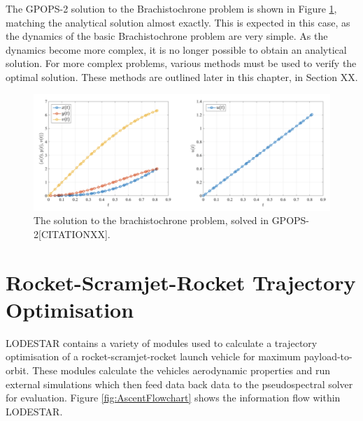 The GPOPS-2 solution to the Brachistochrone problem is shown in Figure \ref{fig:Brachistochrone}, matching the analytical solution almost exactly. This is expected in this case, as the dynamics of the basic Brachistochrone problem are very simple. As the dynamics become more complex, it is no longer possible to obtain an analytical solution. For more complex problems, various methods must be used to verify the optimal solution. These methods are outlined later in this chapter, in Section XX.  

\begin{figure}[ht]
\centering
\includegraphics[width=0.9\linewidth]{figures/4_LODESTAR/Brachistochrone}
\caption{The solution to the brachistochrone problem, solved in GPOPS-2[CITATIONXX].}
\label{fig:Brachistochrone}
\end{figure}





\section{Rocket-Scramjet-Rocket Trajectory Optimisation}


LODESTAR contains a variety of modules used to calculate a trajectory optimisation of a rocket-scramjet-rocket launch vehicle for maximum payload-to-orbit. 
These modules calculate the vehicles aerodynamic properties and run external simulations which then feed data back data to the pseudospectral solver for evaluation. 
Figure \ref{fig:AscentFlowchart} shows the information flow within LODESTAR. 

